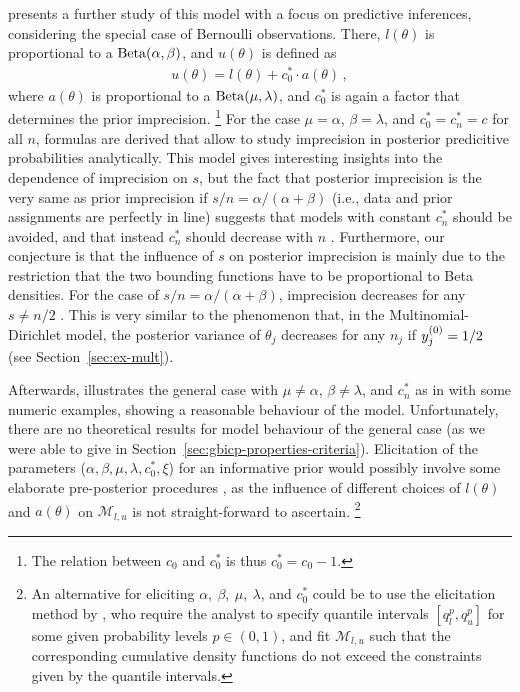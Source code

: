 
\textcite{1994:coolen} presents a further study of this model with a focus on predictive inferences,
considering the special case of Bernoulli observations.
There, $l(\theta)$ is proportional to a $\operatorname{Beta}(\alpha,\beta)$,
and $u(\theta)$ is defined as
\begin{align*}
u(\theta) = l(\theta) + c^*_0 \cdot a(\theta)\,,
\end{align*}
where $a(\theta)$ is proportional to a $\operatorname{Beta}(\mu,\lambda)$,
and $c^*_0$ is again a factor that determines the prior imprecision.%
\footnote{The relation between $c_0$ and $c^*_0$ is thus $c^*_0 = c_0 - 1$.}
For the case $\mu=\alpha$, $\beta=\lambda$, and $c^*_0 = c^*_n = c$ for all $n$,
formulas are derived that allow to study
imprecision in posterior predicitive probabilities analytically.
This model gives interesting insights into the dependence of imprecision on $s$,
but the fact that posterior imprecision is the very same as prior imprecision
if $s/n = \alpha/(\alpha+\beta)$ (i.e., data and prior assignments are perfectly in line)
suggests that models with constant $c^*_n$ should be avoided,
and that instead $c^*_n$ should decrease with $n$
\parencite[p.~160]{1994:coolen}.
Furthermore, our conjecture is that the influence of $s$ on posterior imprecision
is mainly due to the restriction that the two bounding functions have to be
proportional to Beta densities. For the case of $s/n = \alpha/(\alpha+\beta)$,
imprecision decreases for any $s \neq n/2$ \parencite[Table~1]{1994:coolen}.
This is very similar to the phenomenon that, in the Multinomial-Dirichlet model,
the posterior variance of $\theta_j$ decreases for any $n_j$ if $y^{(0)}_j = 1/2$
(see Section~\ref{sec:ex-mult}).

Afterwards, \textcite[\S 4]{1994:coolen} illustrates the general case
with $\mu\neq\alpha$, $\beta\neq\lambda$, and $c^*_n$ as in \textcite{1993:coolen}
with some numeric examples, showing a reasonable behaviour of the model.
Unfortunately, there are no theoretical results for model behaviour of the general case
(as we were able to give in Section~\ref{sec:gbicp-properties-criteria}).
Elicitation of the parameters ($\alpha,\beta,\mu,\lambda,c^*_0,\xi$)
for an informative prior would possibly involve some elaborate pre-posterior procedures
\parencite[p.~163]{1994:coolen},
as the influence of different choices of $l(\theta)$ and $a(\theta)$ on $\mathcal{M}_{l,u}$
is not straight-forward to ascertain.%
\footnote{An alternative for eliciting $\alpha,\ \beta,\ \mu,\ \lambda$, and $c^*_0$
could be to use the elicitation method by \textcite{2011:rinderknecht},
who require the analyst to specify quantile intervals $[q^p_l,q^p_u]$
for some given probability levels $p \in (0,1)$,
and fit $\mathcal{M}_{l,u}$ such that the corresponding cumulative density functions
do not exceed the constraints given by the quantile intervals.}


